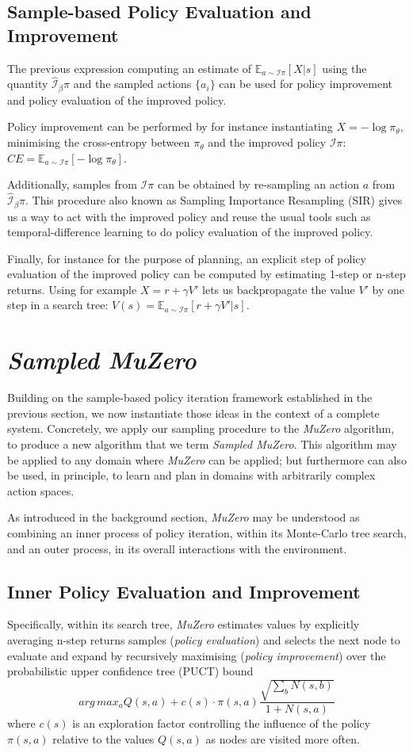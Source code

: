 \documentclass{article}
\newcommand{\muzero}{\emph{MuZero}}
\newcommand{\smuzero}{\emph{Sampled MuZero}}
\newcommand{\ipi}{\mathcal{I}\pi}
\newcommand{\sample}{\beta}
\newcommand{\ibpi}{\hat{\mathcal{I}}_{\sample}\pi}
\begin{document}
\subsection{Sample-based Policy Evaluation and Improvement}
The previous expression computing an estimate of $\mathbb{E}_{a\sim\ipi}[X|s]$ using the quantity $\ibpi$ and the sampled actions $\{a_i\}$ can be used for policy improvement and policy evaluation of the improved policy.

Policy improvement can be performed by for instance instantiating $X=-\log\pi_\theta$, minimising the cross-entropy between $\pi_\theta$ and the improved policy $\ipi$: $CE=\mathbb{E}_{a\sim\ipi}[-\log\pi_\theta]$.

Additionally, samples from $\ipi$ can be obtained by re-sampling an action $a$ from $\ibpi$. This procedure also known as Sampling Importance Resampling (SIR) \cite{sir} gives us a way to act with the improved policy and reuse the usual tools such as temporal-difference learning to do policy evaluation of the improved policy.

Finally, for instance for the purpose of planning, an explicit step of policy evaluation of the improved policy can be computed by estimating 1-step or n-step returns. Using for example $X=r +\gamma V'$ lets us backpropagate the value $V'$ by one step in a search tree: $V(s)=\mathbb{E}_{a\sim\ipi}[r+\gamma V'|s]$.


\section{\smuzero{}}
Building on the sample-based policy iteration framework established in the previous section, we now instantiate those ideas in the context of a complete system. Concretely, we apply our sampling procedure to the \muzero{} algorithm, to produce a new algorithm that we term \smuzero{}. This algorithm may be applied to any domain where \muzero{} can be applied; but furthermore can also be used, in principle, to learn and plan in domains with arbitrarily complex action spaces.

As introduced in the background section, \muzero{} may be understood as combining an inner process of policy iteration, within its Monte-Carlo tree search, and an outer process, in its overall interactions with the environment.

\subsection{Inner Policy Evaluation and Improvement}
Specifically, within its search tree, \muzero{} estimates values by explicitly averaging n-step returns samples (\emph{policy evaluation}) and selects the next node to evaluate and expand by recursively maximising (\emph{policy improvement}) over the probabilistic upper confidence tree (PUCT) bound \cite{Silver16AG} $$arg\,max_a Q(s,a) + c(s) \cdot \pi(s,a)\frac{\sqrt{\sum_b N(s,b)}}{1+N(s,a)}$$ where $c(s)$ is an exploration factor controlling the influence of the policy $\pi(s,a)$ relative to the values $Q(s,a)$ as nodes are visited more often.
\end{document}
